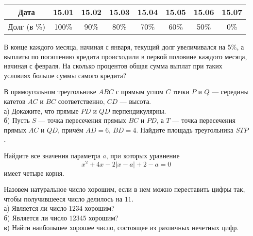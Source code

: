 \begin{training}[2]
\begin{listofex}
\begin{center}
\begin{tabular}{|c|c|c|c|c|c|c|c|}
				\hline
				Дата & 15.01 & 15.02 & 15.03 & 15.04 & 15.05 & 15.06 & 15.07 \\
				\hline
				Долг (в \%) & 100\% & 90\% & 80\% & 70\% & 60\% & 50\% & 0\% \\
				\hline
			\end{tabular}
		\end{center}
		В конце каждого месяца, начиная с января, текущий долг увеличивался
		на 5\%, а выплаты по погашению кредита происходили в первой половине
		каждого месяца, начиная с февраля. На сколько процентов общая сумма
		выплат при таких условиях больше суммы самого кредита?
		\item В прямоугольном треугольнике \( ABC \) с прямым углом \( C \)
		точки \( P \) и \( Q \) --- середины катетов \( AC \) и \( BC \) соответственно, \( CD \) --- высота.\\
		а) Докажите, что прямые \( PD \) и \( QD \) перпендикулярны.\\
		б) Пусть \( S \) --- точка пересечения прямых \( BC \) и \( PD \),
		а \( T \) --- точка пересечения прямых \( AC \) и \( QD \),
		причём \( AD = 6 \), \( BD = 4 \).
		Найдите площадь треугольника \( STP \).
		\item Найдите все значения параметра \( a \), при которых уравнение
		\[ x^2+4x-2|x-a|+2-a=0 \]
		имеет четыре корня.
		\item Назовем натуральное число хорошим, если в нем можно переставить
		цифры так, чтобы получившееся число делилось на \( 11 \).\\
		а) Является ли число \( 1234 \) хорошим?\\
		б) Является ли число \( 12345 \) хорошим?\\
		в) Найти наибольшее хорошее число, состоящее из различных нечетных цифр.
	\end{listofex}
\end{training}

